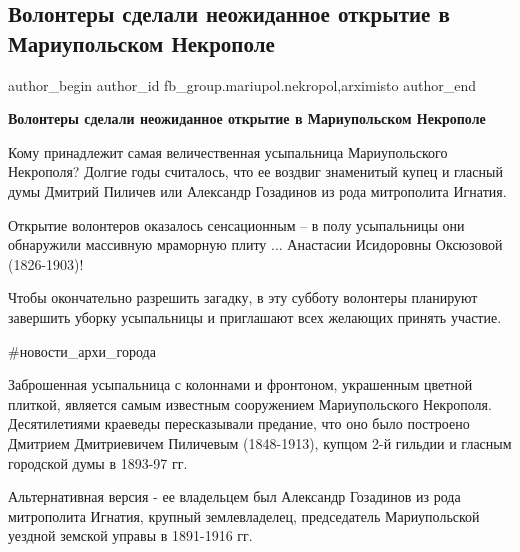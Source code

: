  
 
 
 
 

\subsection{Волонтеры сделали неожиданное открытие в Мариупольском Некрополе}
\label{sec:30_09_2021.fb.fb_group.mariupol.nekropol.1.volontery_otkrytie_mariupol_nekropol}
 
\ifcmt
 author_begin
   author_id fb_group.mariupol.nekropol,arximisto
 author_end
\fi

\vspace{0.5cm}
\textbf{Волонтеры сделали неожиданное открытие в Мариупольском Некрополе}

Кому принадлежит самая величественная усыпальница Мариупольского Некрополя?
Долгие годы считалось, что ее воздвиг знаменитый купец и гласный думы Дмитрий
Пиличев или Александр Гозадинов из рода митрополита Игнатия.

Открытие волонтеров оказалось сенсационным – в полу усыпальницы они обнаружили
массивную мраморную плиту ... Анастасии Исидоровны Оксюзовой (1826-1903)!

Чтобы окончательно разрешить загадку, в эту субботу волонтеры планируют
завершить уборку усыпальницы и приглашают всех желающих принять участие.

\#новости\_архи\_города

Заброшенная усыпальница с колоннами и фронтоном, украшенным цветной плиткой,
является самым известным сооружением Мариупольского Некрополя. Десятилетиями
краеведы пересказывали предание, что оно было построено Дмитрием Дмитриевичем
Пиличевым (1848-1913), купцом 2-й гильдии и гласным городской думы в 1893-97
гг.

Альтернативная версия - ее владельцем был Александр Гозадинов из рода
митрополита Игнатия, крупный землевладелец, председатель Мариупольской уездной
земской управы в 1891-1916 гг.

